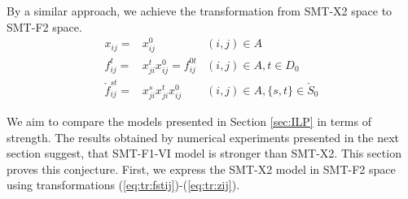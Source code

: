By a similar approach, we achieve the transformation from SMT-X2 space to SMT-F2 space. 
\begin{subequations}
\begin{align}
\label{eq:tr:fstij2}x_{ij}=&x^0_{ij} & (i,j)\in A\\
\label{eq:tr:fijt2}f^t_{ij}=&x^t_{ji}x^0_{ij}=f^{0t}_{ij} & (i,j)\in A, t\in D_0\\
\label{eq:tr:fstij2}\check{f}^{st}_{ij}=& x^s_{ji}x^t_{ji}x^0_{ij} & (i,j)\in A, \{s,t\}\in \check{S}_0
\end{align}
\end{subequations}

We aim to compare the models presented in Section \ref{sec:ILP} in terms of strength. The results obtained by numerical experiments presented in the next section suggest, that SMT-F1-VI model is stronger than SMT-X2. This section proves this conjecture. 
First, we express the SMT-X2 model in SMT-F2 space using transformations (\ref{eq:tr:fstij})-(\ref{eq:tr:zij}). 
